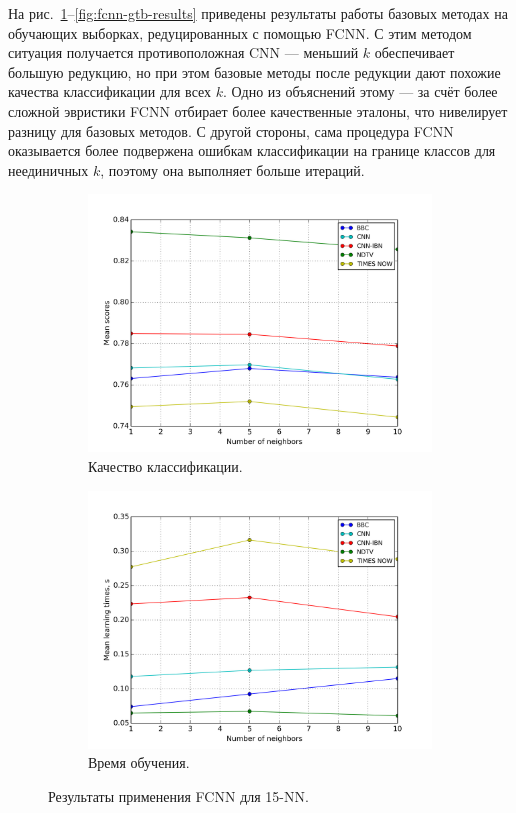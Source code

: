 На рис.~\ref{fig:fcnn-knn-results}--\ref{fig:fcnn-gtb-results} приведены результаты работы базовых методах на обучающих выборках, редуцированных с помощью FCNN. С этим методом ситуация получается противоположная CNN --- меньший \(k\) обеспечивает большую редукцию, но при этом базовые методы после редукции дают похожие качества классификации для всех \(k\). Одно из объяснений этому --- за счёт более сложной эвристики FCNN отбирает более качественные эталоны, что нивелирует разницу для базовых методов. С другой стороны, сама процедура FCNN оказывается более подвержена ошибкам классификации на границе классов для неединичных \(k\), поэтому она выполняет больше итераций.

\begin{figure}[h!]
    \centering
	\begin{subfigure}{0.45\textwidth}
		\includegraphics[width=\textwidth]{images/fcnn-KNN.png}
		\caption{Качество классификации.}
	\end{subfigure}
	\begin{subfigure}{0.45\textwidth}
		\includegraphics[width=\textwidth]{images/fcnn-KNNTime.png}
		\caption{Время обучения.}
	\end{subfigure}
	\caption{Результаты применения FCNN для 15-NN.}\label{fig:fcnn-knn-results}
\end{figure}

